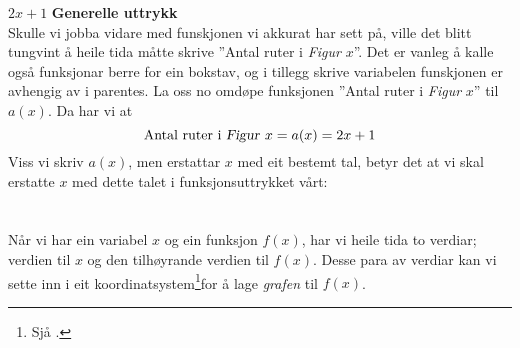 \st{$ {2x+1} $}
\newpage
\textbf{Generelle uttrykk} \\
Skulle vi jobba vidare med funskjonen vi akkurat har sett på, ville det blitt tungvint å heile tida måtte skrive ''Antal ruter i \textsl{Figur }$ x $''. Det er vanleg å kalle også funksjonar berre for ein bokstav, og i tillegg skrive variabelen funskjonen er avhengig av i parentes. La oss no omdøpe funksjonen ''Antal ruter i \textsl{Figur} $ x $'' til $ a(x) $. Da har vi at
\[ \text{Antal ruter i \textsl{Figur }}x=a(x)=2x+1 \]
Viss vi skriv $ a(x) $, men erstattar $ x $ med eit bestemt tal, betyr det at vi skal erstatte $ x $ med dette talet i funksjonsuttrykket vårt:
\newpage
{}
\section{\lingraf}
Når vi har ein variabel $ x $ og ein funksjon $ f(x)  $, har vi heile tida to verdiar; verdien til $ x $ og den tilhøyrande verdien til $ f(x) $. Desse para av verdiar kan vi sette inn i eit koordinatsystem\footnote{Sjå .}for å lage \textit{grafen} til $ f(x) $. \vsk

